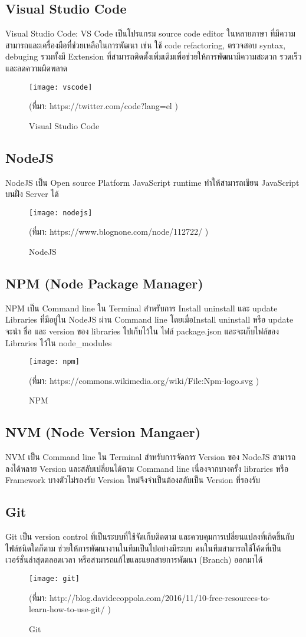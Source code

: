 \subsection{Visual Studio Code}
Visual Studio Code: VS Code เป็นโปรแกรม source code editor ในหลายภาษา ที่มีความสามารถและเครื่องมือที่ช่วยเหลือในการพัฒนา เช่น ใช้ code refactoring, ตรวจสอบ syntax, debuging รวมทั้งมี Extension ที่สามารถติดตั้งเพิ่มเติมเพื่อช่วยให้การพัฒนามีความสะดวก รวดเร็วและลดความผิดพลาด
\begin{figure}[!h]
	\centering
	\texttt{[image: vscode]}
	\caption{Visual Studio Code}
	(ที่มา: 
	https://twitter.com/code?lang=el
	)
	\label{Fig:vscode}
\end{figure}
\subsection{NodeJS}
NodeJS เป็น Open source Platform JavaScript runtime ทำให้สามารถเขียน JavaScript บนฝั่ง Server ได้
\begin{figure}[!h]
	\centering
	\texttt{[image: nodejs]}
	\caption{NodeJS}
	(ที่มา: 
	https://www.blognone.com/node/112722/
	)
	\label{Fig:nodejs}
\end{figure}
\subsection{NPM (Node Package Manager)}
NPM เป็น Command line ใน Terminal สำหรับการ Install uninstall และ update Libraries ที่มีอยู่ใน NodeJS ผ่าน Command line โดยเมื่อInstall uninstall หรือ update
จะนำ ชื่อ และ version ของ libraries ไปเก็บไว้ใน ไฟล์ package.json และจะเก็บไฟล์ของ Libraries ไว้ใน node\_modules
\begin{figure}[!h]
	\centering
	\texttt{[image: npm]}
	\caption{NPM}
	(ที่มา: 
	https://commons.wikimedia.org/wiki/File:Npm-logo.svg
	)
	\label{Fig:npm}
\end{figure}
\subsection{NVM (Node Version Mangaer)}
NVM เป็น  Command line ใน Terminal สำหรับการจัดการ Version ของ NodeJS สามารถลงได้หลาย Version และสลับเปลี่ยนได้ตาม Command line
เนื่องจากบางครั้ง libraries หรือ Framework บางตัวไม่รองรับ Version ใหม่จึงจำเป็นต้องสลับเป็น Version ที่รองรับ 
\subsection{Git}
Git เป็น version control ที่เป็นระบบที่ใช้จัดเก็บติดตาม และควบคุมการเปลี่ยนแปลงที่เกิดขึ้นกับไฟล์ชนิดใดก็ตาม ช่วยให้การพัฒนางานในทีมเป็นไปอย่างมีระบบ คนในทีมสามารถใช้โค้ดที่เป็นเวอร์ชั่นล่าสุดตลอดเวลา หรือสามารถแก้ไขและแยกสายการพัฒนา (Branch) ออกมาได้
\begin{figure}[!h]
	\centering
	\texttt{[image: git]}
	\caption{Git}
	(ที่มา: 
	http://blog.davidecoppola.com/2016/11/10-free-resources-to-learn-how-to-use-git/
	)
	\label{Fig:git}
\end{figure}

